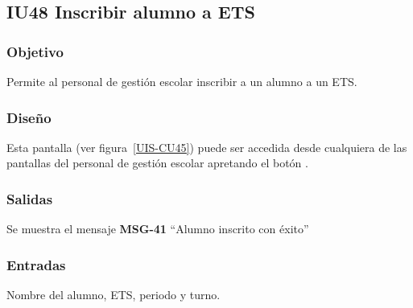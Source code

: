 
\subsection{IU48 Inscribir alumno a ETS}

\subsubsection{Objetivo}
Permite al personal de gestión escolar inscribir a un alumno a un ETS.
\subsubsection{Diseño}
Esta pantalla  (ver figura~\ref{UIS-CU45}) puede ser accedida desde cualquiera de las pantallas del personal de gestión escolar apretando el botón .


\subsubsection{Salidas}
Se muestra el mensaje {\bf MSG-41} ``Alumno inscrito con éxito''
\subsubsection{Entradas}
Nombre del alumno, ETS, periodo y turno.
